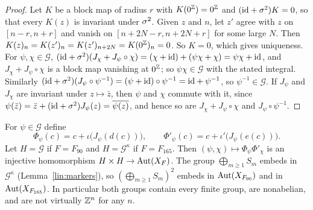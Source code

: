 \begin{proof}
Let $K$ be a block map of radius $r$ with $K(0^{\mathbb{Z}})=0^{\mathbb{Z}}$ and $(\mathrm{id}+\sigma^2)K=0$, so that every $K(z)$ is invariant under $\sigma^2$. Given $z$ and $n$, let $z'$ agree with $z$ on $[n-r,n+r]$ and vanish on $[n+2N-r,n+2N+r]$ for some large $N$. Then $K(z)_n=K(z')_n=K(z')_{n+2N}=K(0^{\mathbb{Z}})_n=0$. So $K=0$, which gives uniqueness. For $\psi,\chi\in\mathcal G$, $(\mathrm{id}+\sigma^2)(J_\chi+J_\psi\circ\chi)=(\chi+\mathrm{id})+(\psi\chi+\chi)=\psi\chi+\mathrm{id}$, and $J_\chi+J_\psi\circ\chi$ is a block map vanishing at $0^{\mathbb{Z}}$; so $\psi\chi\in\mathcal G$ with the stated integral. Similarly $(\mathrm{id}+\sigma^2)(J_\psi\circ\psi^{-1})=(\psi+\mathrm{id})\circ\psi^{-1}=\mathrm{id}+\psi^{-1}$, so $\psi^{-1}\in\mathcal G$. If $J_\psi$ and $J_\chi$ are invariant under $z\mapsto\bar z$, then $\psi$ and $\chi$ commute with it, since $\psi(\bar z)=\bar z+(\mathrm{id}+\sigma^2)J_\psi(z)=\overline{\psi(z)}$, and hence so are $J_\chi+J_\psi\circ\chi$ and $J_\psi\circ\psi^{-1}$.
\end{proof}

\begin{theorem}\label{lin:movers}
For $\psi\in\mathcal G$ define
\[
\Phi_\psi(c)=c+\iota\bigl(J_\psi(d(c))\bigr),\qquad \Phi'_\psi(c)=c+\iota'\bigl(J_\psi(e(c))\bigr).
\]
Let $H=\mathcal G$ if $F=F_{90}$ and $H=\mathcal G^{\kappa}$ if $F=F_{165}$. Then $(\psi,\chi)\mapsto\Phi_\psi\Phi'_\chi$ is an injective homomorphism $H\times H\to\operatorname{Aut}(X_F)$. The group $\bigoplus_{m\ge1}S_m$ embeds in $\mathcal G^{\kappa}$ (Lemma~\ref{lin:markers}), so $(\bigoplus_{m\ge1}S_m)^2$ embeds in $\operatorname{Aut}(X_{F_{90}})$ and in $\operatorname{Aut}(X_{F_{165}})$. In particular both groups contain every finite group, are nonabelian, and are not virtually $\mathbb{Z}^n$ for any $n$.
\end{theorem}

